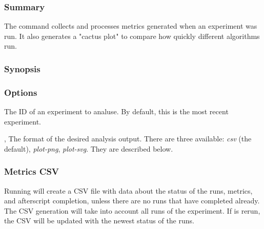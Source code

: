 \documentclass[a4paper,english]{article}
\begin{document}
\begin{adjustwidth}{18pt}{0pt}
            \subsubsection{Summary}
                The   command collects and processes metrics generated
                when an experiment was run.
                It also generates a "cactus plot" to compare how quickly different algorithms run.


            \subsubsection{Synopsis}
                 

            \subsubsection{Options}
                \begin{Description}[Options]
                  \item[\Arg{experiment-id}]
                    The ID of an experiment to analuse.
                    By default, this is the most recent experiment.
                  \item[\OptArg{-o}{ format}, \OptArg{--output}{ format}]
                    The format of the desired analysis output. There are three available:
                    \emph{csv} (the default), \emph{plot-png}, \emph{plot-svg}. They are described below.
                \end{Description}

            \subsubsection{Metrics CSV}
                Running    will create a CSV file with
                data about the status of the runs, metrics, and afterscript completion, unless there
                are no runs that have completed already.
                The CSV generation will take into account all runs of the experiment. If 
                 is rerun, the CSV will be updated with the newest status of the runs.


\end{adjustwidth}
\end{document}
